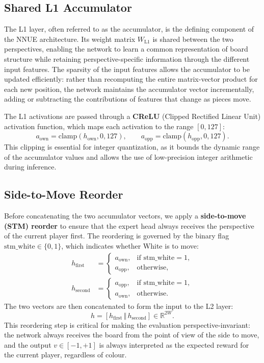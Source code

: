 \subsection{Shared L1 Accumulator}\label{sec:l1-accumulator}

The L1 layer, often referred to as the accumulator, is the defining component of the NNUE architecture. Its weight matrix \(W_{\mathrm{L1}}\) is shared between the two perspectives, enabling the network to learn a common representation of board structure while retaining perspective-specific information through the different input features. The sparsity of the input features allows the accumulator to be updated efficiently: rather than recomputing the entire matrix-vector product for each new position, the network maintains the accumulator vector incrementally, adding or subtracting the contributions of features that change as pieces move.

The L1 activations are passed through a \textbf{CReLU} (Clipped Rectified Linear Unit) activation function, which maps each activation to the range \([0, 127]\):
\[
a_{\mathrm{own}} = \mathrm{clamp}(h_{\mathrm{own}}, 0, 127), \qquad
a_{\mathrm{opp}} = \mathrm{clamp}(h_{\mathrm{opp}}, 0, 127).
\]
This clipping is essential for integer quantization, as it bounds the dynamic range of the accumulator values and allows the use of low-precision integer arithmetic during inference.

\subsection{Side-to-Move Reorder}\label{sec:stm-reorder}

Before concatenating the two accumulator vectors, we apply a \textbf{side-to-move (STM) reorder} to ensure that the expert head always receives the perspective of the current player first. The reordering is governed by the binary flag \(\mathrm{stm\_white} \in \{0,1\}\), which indicates whether White is to move:
\begin{align*}
h_{\mathrm{first}} &=
\begin{cases}
a_{\mathrm{own}}, & \text{if } \mathrm{stm\_white} = 1, \\
a_{\mathrm{opp}}, & \text{otherwise},
\end{cases}
\\
h_{\mathrm{second}} &=
\begin{cases}
a_{\mathrm{opp}}, & \text{if } \mathrm{stm\_white} = 1, \\
a_{\mathrm{own}}, & \text{otherwise}.
\end{cases}
\end{align*}
The two vectors are then concatenated to form the input to the L2 layer:
\[
h = [h_{\mathrm{first}} \, \Vert \, h_{\mathrm{second}}] \in \mathbb{R}^{2W}.
\]
This reordering step is critical for making the evaluation perspective-invariant: the network always receives the board from the point of view of the side to move, and the output \(v \in [-1, +1]\) is always interpreted as the expected reward for the current player, regardless of colour.

